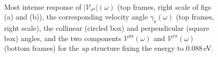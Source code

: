 \documentclass[prb,11pt,tightenlines,twocolumn,aps]{revtex4-1}
\begin{document}
\begin{figure}[t]
    \centering
    \\

    \caption{Most intense response of
    $|\mathcal{V}_{\sigma^{\mathrm{z}}}|(\omega)$ (top frames, right scale of
    figs (a) and (b)), the corresponding velocity angle
    $\gamma_{\mathrm{z}}(\omega)$ (top frames, right scale), the collinear
    (circled box) and perpendicular (square box) angles, and the two components
    $\mathcal{V}^{\mathrm{xz}}(\omega)$ and $\mathcal{V}^{\mathrm{yz}}(\omega)$
    (bottom frames) for the \emph{up} structure fixing the energy to 0.088\,eV.
    }
    \label{fig:up-vaz-rag}
\end{figure}
\end{document}
